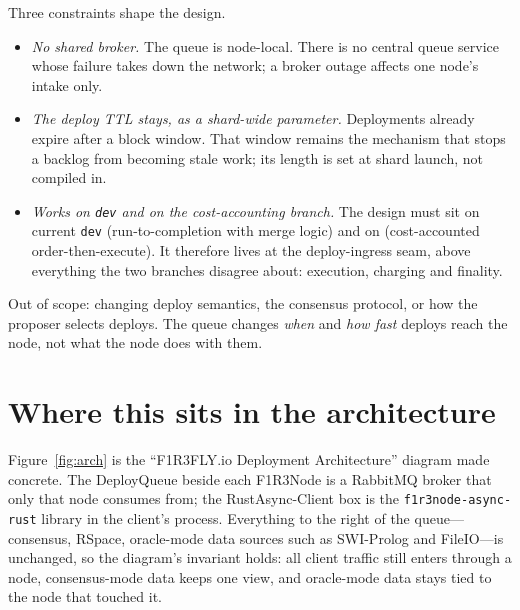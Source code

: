 \documentclass[11pt]{article}
\newcommand{\code}[1]{\texttt{#1}}
\newcommand{\dev}{\code{dev}}
\newcommand{\ote}{\path{feature/rev-stacks-ote}}
\begin{document}
Three constraints shape the design.
\begin{itemize}[leftmargin=2em]
  \item \emph{No shared broker.} The queue is node-local. There is no central queue
    service whose failure takes down the network; a broker outage affects one node's
    intake only.
  \item \emph{The deploy TTL stays, as a shard-wide parameter.} Deployments already
    expire after a block window. That window remains the mechanism that stops a
    backlog from becoming stale work; its length is set at shard launch, not compiled
    in.
  \item \emph{Works on \dev{} and on the cost-accounting branch.} The design must sit
    on current \dev{} (run-to-completion with merge logic) and on \ote{}
    (cost-accounted order-then-execute). It therefore lives at the deploy-ingress
    seam, above everything the two branches disagree about: execution, charging and
    finality.
\end{itemize}

Out of scope: changing deploy semantics, the consensus protocol, or how the proposer
selects deploys. The queue changes \emph{when} and \emph{how fast} deploys reach the
node, not what the node does with them.

\section{Where this sits in the architecture}

Figure~\ref{fig:arch} is the ``F1R3FLY.io Deployment Architecture'' diagram made
concrete. The DeployQueue beside each F1R3Node is a RabbitMQ broker that only that
node consumes from; the RustAsync-Client box is the \code{f1r3node-async-rust}
library in the client's process. Everything to the right of the queue---consensus,
RSpace, oracle-mode data sources such as SWI-Prolog and FileIO---is unchanged, so the
diagram's invariant holds: all client traffic still enters through a node,
consensus-mode data keeps one view, and oracle-mode data stays tied to the node that
touched it.
\end{document}
